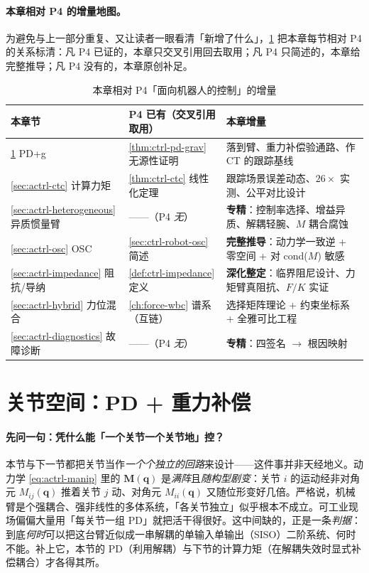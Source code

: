 \paragraph{本章相对 P4 的增量地图。}
为避免与上一部分重复、又让读者一眼看清「新增了什么」，\cref{tab:actrl-delta} 把本章每节相对 P4 的关系标清：凡 P4 已证的，本章只交叉引用回去取用；凡 P4 只简述的，本章给完整推导；凡 P4 没有的，本章原创补足。

\begin{table}[H]\centering\small
\caption{本章相对 P4「面向机器人的控制」的增量}
\label{tab:actrl-delta}
\begin{tabular}{p{} p{} p{}}
\toprule
本章节 & P4 已有（交叉引用取用） & 本章增量 \\
\midrule
\cref{sec:actrl-pdg} PD+g & \cref{thm:ctrl-pd-grav} 无源性证明 & 落到臂、重力补偿验通路、作 CT 的跟踪基线 \\
\cref{sec:actrl-ctc} 计算力矩 & \cref{thm:ctrl-ctc} 线性化定理 & 跟踪场景误差动态、$26\times$ 实测、公平对比设计 \\
\cref{sec:actrl-heterogeneous} 异质惯量臂 & ——（P4 \emph{无}） & \textbf{专精}：控制率选择、增益异质、解耦轻腕、$M$ 耦合腐蚀 \\
\cref{sec:actrl-osc} OSC & \cref{sec:ctrl-robot-osc} 简述 & \textbf{完整推导}：动力学一致逆 + 零空间 + 对 cond($M$) 敏感 \\
\cref{sec:actrl-impedance} 阻抗/导纳 & \cref{def:ctrl-impedance} 定义 & \textbf{深化整定}：临界阻尼设计、力矩臂真阻抗、$F/K$ 实证 \\
\cref{sec:actrl-hybrid} 力位混合 & \cref{ch:force-wbc} 谱系（互链）& 选择矩阵理论 + 约束坐标系 + 全雅可比工程 \\
\cref{sec:actrl-diagnostics} 故障诊断 & ——（P4 \emph{无}）& \textbf{专精}：四签名 $\to$ 根因映射 \\
\bottomrule
\end{tabular}
\end{table}

\section{关节空间：PD + 重力补偿}
\label{sec:actrl-pdg}

\paragraph{先问一句：凭什么能「一个关节一个关节地」控？}
本节与下一节都把关节当作\emph{一个个独立的回路}来设计——这件事并非天经地义。动力学 \cref{eq:actrl-manip} 里的 $\mathbf{M}(\mathbf{q})$ 是\emph{满阵}且\emph{随构型剧变}：关节 $i$ 的运动经非对角元 $M_{ij}(\mathbf{q})$ 推着关节 $j$ 动、对角元 $M_{ii}(\mathbf{q})$ 又随位形变好几倍。严格说，机械臂是个强耦合、强非线性的多体系统，「各关节独立」似乎根本不成立。可工业现场偏偏大量用「每关节一组 PD」就把活干得很好。这中间缺的，正是一条\emph{判据}：到底\emph{何时}可以把这台臂近似成一串解耦的单输入单输出（SISO）二阶系统、何时不能。补上它，本节的 PD（利用解耦）与下节的计算力矩（在解耦失效时显式补偿耦合）才各得其所。

